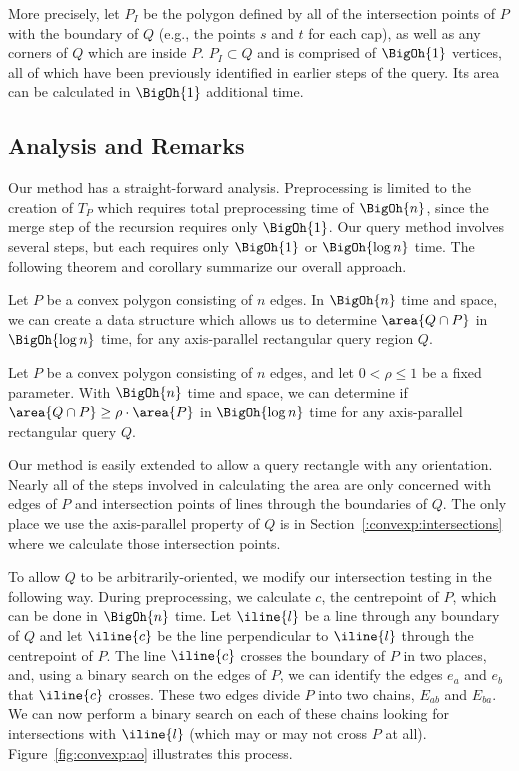 More precisely, let $P_I$ be the polygon defined by all of the intersection  points of $P$ with the boundary of $Q$ (e.g., the points $s$ and $t$ for each cap), as well as any corners of $Q$ which are inside $P$. $P_I \subset Q$ and is comprised of $\BigOh{1}$ vertices, all of which have been previously identified in earlier steps of the query. Its area can be calculated in $\BigOh{1}$ additional time.


\subsection{Analysis and Remarks}
\label{:convexp:analysis}

Our method has a straight-forward analysis. 
Preprocessing is limited to the creation of $T_P$ which requires total preprocessing time of $\BigOh{n}$, since the merge step of the recursion requires only $\BigOh{1}$.
Our query method involves several steps, but each requires only $\BigOh{1}$ or $\BigOh{\log{n}}$ time. 
The following theorem and corollary summarize our overall approach.

\begin{theorem}
\label{th:convexp:area}
Let $P$ be a convex polygon consisting of $n$ edges. In $\BigOh{n}$ time and space, we can create a data structure which allows us to determine $\area{Q \cap P}$ 
in $\BigOh{\log{n}}$ time, for any axis-parallel rectangular query region $Q$.
\end{theorem}

\begin{corollary}
\label{cor:convexp:mp}
Let $P$ be a convex polygon consisting of $n$ edges, and let $0 < \rho \leq 1$ be a fixed parameter. With $\BigOh{n}$ time and space, we can determine if $\area{Q \cap P} \geq \rho \cdot \area{P}$ in $\BigOh{\log{n}}$ time for any axis-parallel rectangular query $Q$.
\end{corollary}

Our method is easily extended to allow a query rectangle with any orientation.
Nearly all of the steps involved in calculating the area are only concerned with edges of $P$ and intersection points of lines through the boundaries of $Q$.
The only place we use the axis-parallel property of $Q$ is in Section~\ref{:convexp:intersections} where we calculate those intersection points.

To allow $Q$ to be arbitrarily-oriented, we modify our intersection testing in the following way. 
During preprocessing, we calculate $c$, the centrepoint of $P$, which can be done in $\BigOh{n}$ time.
Let $\iline{l}$ be a line through any boundary of $Q$ and let $\iline{c}$ be the line perpendicular to $\iline{l}$ through the centrepoint of $P$.
The line $\iline{c}$ crosses the boundary of $P$ in two places, and, using a binary search on the edges of $P$, we can identify the edges $e_a$ and $e_b$ that $\iline{c}$ crosses.
These two edges divide $P$ into two chains, $E_{ab}$ and $E_{ba}$.
We can now perform a binary search on each of these chains looking for intersections with $\iline{l}$ (which may or may not cross $P$ at all).
Figure~\ref{fig:convexp:ao} illustrates this process.

